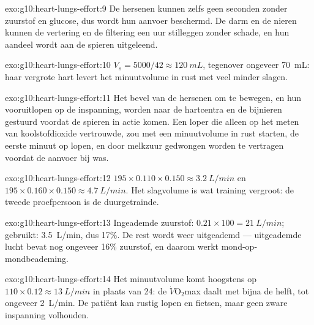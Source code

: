 \begin{solution}{exo:g10:heart-lungs-effort:9}
De hersenen kunnen zelfs geen seconden zonder zuurstof en glucose, dus
wordt hun aanvoer beschermd. De darm en de nieren kunnen de vertering en
de filtering een uur stilleggen zonder schade, en hun aandeel wordt aan
de spieren uitgeleend.
\end{solution}

\begin{solution}{exo:g10:heart-lungs-effort:10}
$V_s = 5000/42 \approx \qty{120}{mL}$, tegenover ongeveer \qty{70}{mL}:
haar vergrote hart levert het minuutvolume in rust met veel minder
slagen.
\end{solution}

\begin{solution}{exo:g10:heart-lungs-effort:11}
Het bevel van de hersenen om te bewegen, en hun vooruitlopen op de
inspanning, worden naar de hartcentra en de bijnieren gestuurd voordat de
spieren in actie komen. Een loper die alleen op het meten van
koolstofdioxide vertrouwde, zou met een minuutvolume in rust starten, de
eerste minuut op  lopen, en door melkzuur gedwongen worden te
vertragen voordat de aanvoer bij was.
\end{solution}

\begin{solution}{exo:g10:heart-lungs-effort:12}
$195 \times 0.110 \times 0.150 \approx \qty{3.2}{L/min}$ en
$195 \times 0.160 \times 0.150 \approx \qty{4.7}{L/min}$. Het slagvolume
is wat training vergroot: de tweede proefpersoon is de duurgetrainde.
\end{solution}

\begin{solution}{exo:g10:heart-lungs-effort:13}
Ingeademde zuurstof: $0.21 \times 100 = \qty{21}{L/min}$; gebruikt:
\qty{3.5}{L/min}, dus 17\%. De rest wordt weer uitgeademd --- uitgeademde
lucht bevat nog ongeveer 16\% zuurstof, en daarom werkt
mond-op-mondbeademing.
\end{solution}

\begin{solution}{exo:g10:heart-lungs-effort:14}
Het minuutvolume komt hoogstens op $110 \times 0.12 \approx \qty{13}{L/min}$
in plaats van 24: de $\dot V\!\mathrm{O_2}$max daalt met
bijna de helft, tot ongeveer \qty{2}{L/min}. De patiënt kan rustig lopen
en fietsen, maar geen zware inspanning volhouden.
\end{solution}

